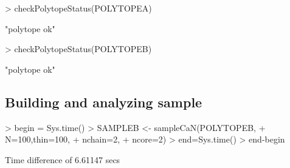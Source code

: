 \documentclass{article}
\begin{document}
\begin{Schunk}
\begin{Sinput}
> checkPolytopeStatus(POLYTOPEA)
\end{Sinput}
\begin{Soutput}
[1] "polytope ok"
\end{Soutput}
\begin{Sinput}
> checkPolytopeStatus(POLYTOPEB)
\end{Sinput}
\begin{Soutput}
[1] "polytope ok"
\end{Soutput}
\end{Schunk}

\subsection{Building and analyzing sample}

\begin{Schunk}
\begin{Sinput}
> begin = Sys.time()
> SAMPLEB <- sampleCaN(POLYTOPEB, 
+                       N=100,thin=100, 
+                       nchain=2,
+                       ncore=2)
> end=Sys.time()
> end-begin
\end{Sinput}
\begin{Soutput}
Time difference of 6.61147 secs
\end{Soutput}
\end{Schunk}
\end{document}
